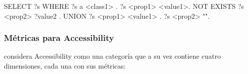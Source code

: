 \begin{listing}[
  float=ht,
  language = SQL,
  numbers=left,
  numberstyle=\tiny,
  stepnumber=1,
  numbersep=5pt,
  frame=single,
  caption  = {Consulta \acs{SPARQL} para identificación de literales perdidos (y
  II)},
  label    = code:query2]
SELECT ?s 
WHERE { {
      ?s a <class1> .
      ?s <prop1> <value1>.
   NOT EXISTS{
      ?s <prop2> ?value2 .
   }
   }UNION{
      ?s <prop1> <value1> .
      ?s <prop2> "".
   }}
\end{listing}



\subsubsection{Métricas para Accessibility}
\label{sec:dqassessment-accessibility}
\cite{zaveri_quality_2013} considera Accessibility como una
categoría que a su vez contiene cuatro dimensiones, cada una con sus métricas: 

